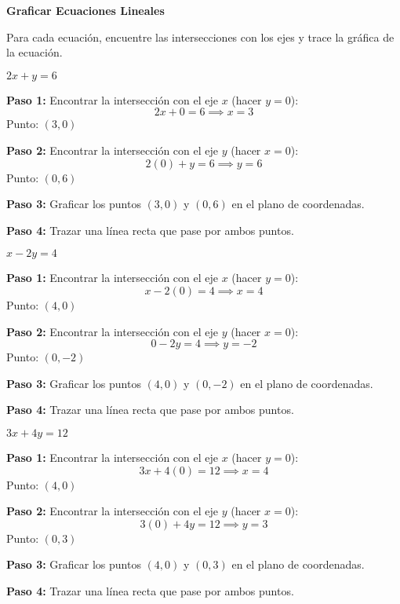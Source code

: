 \begin{exercise}
\textbf{Graficar Ecuaciones Lineales}

Para cada ecuación, encuentre las intersecciones con los ejes y trace la gráfica de la ecuación.

\problem $2x + y = 6$

\begin{solucion}
\textbf{Paso 1:} Encontrar la intersección con el eje $x$ (hacer $y = 0$):
$$2x + 0 = 6 \implies x = 3$$
Punto: $(3, 0)$

\textbf{Paso 2:} Encontrar la intersección con el eje $y$ (hacer $x = 0$):
$$2(0) + y = 6 \implies y = 6$$
Punto: $(0, 6)$

\textbf{Paso 3:} Graficar los puntos $(3, 0)$ y $(0, 6)$ en el plano de coordenadas.

\textbf{Paso 4:} Trazar una línea recta que pase por ambos puntos.
\end{solucion}

\problem $x - 2y = 4$

\begin{solucion}
\textbf{Paso 1:} Encontrar la intersección con el eje $x$ (hacer $y = 0$):
$$x - 2(0) = 4 \implies x = 4$$
Punto: $(4, 0)$

\textbf{Paso 2:} Encontrar la intersección con el eje $y$ (hacer $x = 0$):
$$0 - 2y = 4 \implies y = -2$$
Punto: $(0, -2)$

\textbf{Paso 3:} Graficar los puntos $(4, 0)$ y $(0, -2)$ en el plano de coordenadas.

\textbf{Paso 4:} Trazar una línea recta que pase por ambos puntos.
\end{solucion}

\problem $3x + 4y = 12$

\begin{solucion}
\textbf{Paso 1:} Encontrar la intersección con el eje $x$ (hacer $y = 0$):
$$3x + 4(0) = 12 \implies x = 4$$
Punto: $(4, 0)$

\textbf{Paso 2:} Encontrar la intersección con el eje $y$ (hacer $x = 0$):
$$3(0) + 4y = 12 \implies y = 3$$
Punto: $(0, 3)$

\textbf{Paso 3:} Graficar los puntos $(4, 0)$ y $(0, 3)$ en el plano de coordenadas.

\textbf{Paso 4:} Trazar una línea recta que pase por ambos puntos.
\end{solucion}


\end{exercise}
